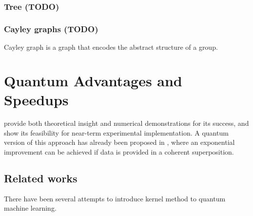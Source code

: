 \subsubsection{Tree (TODO)}

\subsubsection{Cayley graphs (TODO)}
\begin{definition}\label{def:cayley_graph}
	Cayley graph is a graph that encodes the abstract structure of a group. 
\end{definition}

\section{Quantum Advantages and Speedups}\label{sec:speedup}
provide both theoretical insight and numerical demonstrations for its success, and show its feasibility for near-term experimental implementation.
A quantum version of this approach has already been proposed in \cite{rebentrostQuantumSupportVector2014},
where an exponential improvement can be achieved if data is provided in a coherent superposition. 

\subsection{Related works}\label{sec:qke}
There have been several attempts to introduce kernel method to quantum machine learning.

